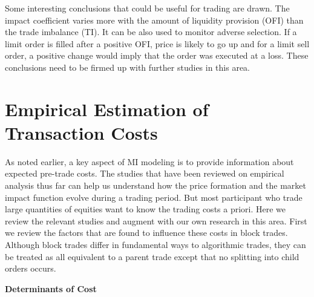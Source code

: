 Some interesting conclusions that could be useful for trading are drawn. The impact coefficient varies more with the amount of liquidity provision (OFI) than the trade imbalance (TI). It can be also used to monitor adverse selection. If a limit order is filled after a positive OFI, price is likely to go up and for a limit sell order, a positive change would imply that the order was executed at a loss. These conclusions need to be firmed up with further studies in this area.



\section{Empirical Estimation of Transaction Costs\label{sec:emp_est_trans_cost}} \label{in:transcost3}

As noted earlier, a key aspect of MI modeling is to provide information about expected pre-trade costs. The studies that have been reviewed on empirical analysis thus far can help us understand how the price formation and the market impact function evolve during a trading period. But most participant who trade large quantities of equities want to know the trading costs a priori. Here we review the relevant studies and augment with our own research in this area. First we review the factors that are found to influence these costs in block trades. Although block trades differ in fundamental ways to algorithmic trades, they can be treated as all equivalent to a parent trade except that no splitting into child orders occurs. \twomedskip


\noindent\textbf{Determinants of Cost} 

